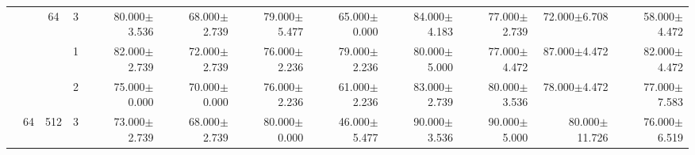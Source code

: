 \begin{table}[htpb]
{\begin{tabular}{c|c|c|c|rr|rr|rr|rr}
                                 &                                                                                 & \multirow{-3}{*}{64}                                                                   & 3                                                                                         & 80.000$\pm$3.536                        & 68.000$\pm$2.739                        & 79.000$\pm$5.477                        & 65.000$\pm$0.000                        & 84.000$\pm$4.183                         & 77.000$\pm$2.739                         & 72.000$\pm$6.708                        & 58.000$\pm$4.472                       \\ \cline{3-12} 
                                 &                                                                                 &                                                                                        & 1                                                                                         & 82.000$\pm$2.739                        & 72.000$\pm$2.739                        & 76.000$\pm$2.236                        & 79.000$\pm$2.236                        & 80.000$\pm$5.000                         & 77.000$\pm$4.472                         & 87.000$\pm$4.472                        & 82.000$\pm$4.472                       \\
                                 &                                                                                 &                                                                                        & 2                                                                                         & 75.000$\pm$0.000                        & 70.000$\pm$0.000                        & 76.000$\pm$2.236                        & 61.000$\pm$2.236                        & 83.000$\pm$2.739                         & 80.000$\pm$3.536                         & 78.000$\pm$4.472                        & 77.000$\pm$7.583                       \\
                                 & \multirow{-6}{*}{64}                                                            & \multirow{-3}{*}{512}                                                                  & 3                                                                                         & 73.000$\pm$2.739                        & 68.000$\pm$2.739                        & 80.000$\pm$0.000                        & 46.000$\pm$5.477                        & 90.000$\pm$3.536                         & 90.000$\pm$5.000                         & 80.000$\pm$11.726                       & 76.000$\pm$6.519                       \\ \cline{2-12} 

\end{tabular}}
\end{table}
